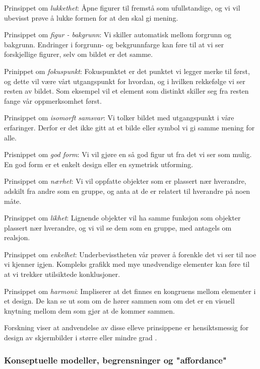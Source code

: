 \noindent
Prinsippet om \emph{lukkethet}: Åpne figurer til fremstå som ufullstandige, og vi vil ubevisst prøve å lukke formen for at den skal gi mening.

\noindent
Prinsippet om \emph{figur - bakgrunn}: Vi skiller automatisk mellom forgrunn og bakgrunn. Endringer i forgrunn- og bekgrunnfarge kan føre til at vi ser forskjellige figurer, selv om bildet er det samme.

\noindent
Prinippet om \emph{fokuspunkt}: Fokuspunktet er det punktet vi legger merke til først, og dette vil være vårt utgangspunkt for hvordan, og i hvilken rekkefølge vi ser resten av bildet. Som eksempel vil et element som distinkt skiller seg fra resten fange vår oppmerksomhet først.

\noindent
Prinsippet om \emph{isomorft samsvar}: Vi tolker bildet med utgangspunkt i våre erfaringer. Derfor er det ikke gitt at et bilde eller symbol vi gi samme mening for alle.

\noindent
Prisnippet om \emph{god form}: Vi vil gjøre en så god figur ut fra det vi ser som mulig. En god form er et enkelt design eller en symetrisk utforming.

\noindent
Prinsippet om \emph{nærhet}: Vi vil oppfatte objekter som er plassert nær hverandre, adskilt fra andre som en gruppe, og anta at de er relatert til hverandre på noen måte.

\noindent
Prinsippet om \emph{likhet}: Lignende objekter vil ha samme funksjon som objekter plassert nær hverandre, og vi vil se dem som en gruppe, med antagels om realsjon.

\noindent
Prinsippet om \emph{enkelhet}: Underbevisstheten vår prøver å forenkle det vi ser til noe vi kjenner igjen. Kompleks grafikk med mye unødvendige elementer kan føre til at vi trekker utilsiktede konklusjoner.

\noindent
Prinsippet om \emph{harmoni}: Impliserer at det finnes en kongruens mellom elementer i et design. De kan se ut som om de hører sammen som om det er en visuell knytning mellom dem som gjør at de kommer sammen.

\noindent
Forskning viser at andvendelse av disse elleve prinsippene er hensiktsmessig for design av skjermbilder i større eller mindre grad \cite{Chang02}.

\noindent
\subsubsection{Konseptuelle modeller, begrensninger og "affordance"}

